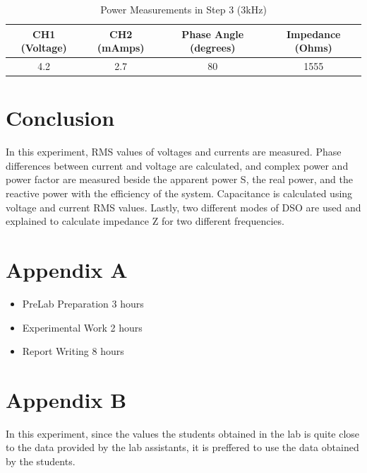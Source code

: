 \documentclass[letterpaper,12pt]{article}
\begin{document}
\begin{table}[H]
    \begin{center}
        \caption{Power Measurements in Step 3 (3kHz)}
        \vspace{2mm}
        \begin{tabular}{||c | c | c | c ||} 
            \hline
            CH1 (Voltage) & CH2 (mAmps) & Phase Angle (degrees) & Impedance (Ohms)   \\ [0.5ex] 
            \hline\hline
            4.2 & 2.7  & 80    & 1555   \\ 
            \hline
        \end{tabular}
\end{center}
\end{table}

\section{Conclusion}
In this experiment, RMS values of voltages and currents are measured. Phase differences between current and voltage are calculated, and complex power and power factor are measured beside the apparent power S, the real power, and the reactive power with the efficiency of the system. Capacitance is calculated using voltage and current RMS values. Lastly, two different modes of DSO are used and explained to calculate impedance Z for two different frequencies.


\section*{Appendix A}
\begin{itemize}
    \item PreLab Preparation 3 hours
    \item Experimental Work 2  hours
    \item Report Writing 8 hours
\end{itemize}
\section*{Appendix B}
In this experiment, since the values the students obtained in the lab is quite close to the data provided by the lab assistants, it is preffered to use the data obtained by the students.
\end{document}
